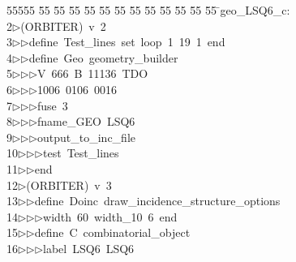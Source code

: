 %
%
\begin{tabbing}
55555 \= 55 \= 55 \= 55 \= 55 \= 55 \= 55 \= 55 \= 55 \= 55 \= 55 \= 55 \= 55 \= \>geo\_LSQ6\_c:\\[0pt]
2\>$\triangleright$\>(ORBITER)\ v\ 2\ \\[0pt]
3\>$\triangleright$\>$\triangleright$\>define\ Test\_lines\ set\ loop\ 1\ 19\ 1\ end\ \\[0pt]
4\>$\triangleright$\>$\triangleright$\>define\ Geo\ geometry\_builder\ \\[0pt]
5\>$\triangleright$\>$\triangleright$\>$\triangleright$\>V\ 666\ B\ 11136\ TDO\ \\[0pt]
6\>$\triangleright$\>$\triangleright$\>$\triangleright$\>1006\ 0106\ 0016\ \\[0pt]
7\>$\triangleright$\>$\triangleright$\>$\triangleright$\>fuse\ 3\ \\[0pt]
8\>$\triangleright$\>$\triangleright$\>$\triangleright$\>fname\_GEO\ LSQ6\ \\[0pt]
9\>$\triangleright$\>$\triangleright$\>$\triangleright$\>output\_to\_inc\_file\ \\[0pt]
10\>$\triangleright$\>$\triangleright$\>$\triangleright$\>test\ Test\_lines\ \\[0pt]
11\>$\triangleright$\>$\triangleright$\>end\\[0pt]
12\>$\triangleright$\>(ORBITER)\ v\ 3\ \\[0pt]
13\>$\triangleright$\>$\triangleright$\>define\ Doinc\ draw\_incidence\_structure\_options\ \\[0pt]
14\>$\triangleright$\>$\triangleright$\>$\triangleright$\>width\ 60\ width\_10\ 6\ end\ \\[0pt]
15\>$\triangleright$\>$\triangleright$\>define\ C\ combinatorial\_object\ \\[0pt]
16\>$\triangleright$\>$\triangleright$\>$\triangleright$\>label\ LSQ6\ LSQ6\ \\[0pt]

\end{tabbing}
